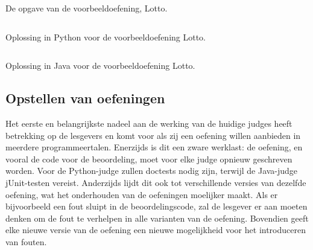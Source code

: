 \begin{listing}
    \begin{quote}
    \end{quote}
    \caption{De opgave van de voorbeeldoefening, Lotto.}
    \label{lst:lotto}
\end{listing}

\begin{listing}
    \inputminted{python3}{../../exercise/lotto/solution/correct.py}
    \caption{Oplossing in Python voor de voorbeeldoefening Lotto.}
    \label{lst:python-solution}
\end{listing}

\begin{listing}
    \inputminted{java}{../../exercise/lotto/solution/correct.java}
    \caption{Oplossing in Java voor de voorbeeldoefening Lotto.}
    \label{lst:java-solution}
\end{listing}

\subsection{Opstellen van oefeningen}\label{subsec:opstellen-van-oefeningen}

Het eerste en belangrijkste nadeel aan de werking van de huidige judges heeft betrekking op de lesgevers en komt voor als zij een oefening willen aanbieden in meerdere programmeertalen.
Enerzijds is dit een zware werklast: de oefening, en vooral de code voor de beoordeling, moet voor elke judge opnieuw geschreven worden.
Voor de Python-judge zullen doctests nodig zijn, terwijl de Java-judge jUnit-testen vereist.
Anderzijds lijdt dit ook tot verschillende versies van dezelfde oefening, wat het onderhouden van de oefeningen moelijker maakt.
Als er bijvoorbeeld een fout sluipt in de beoordelingscode, zal de lesgever er aan moeten denken om de fout te verhelpen in alle varianten van de oefening.
Bovendien geeft elke nieuwe versie van de oefening een nieuwe mogelijkheid voor het introduceren van fouten.

